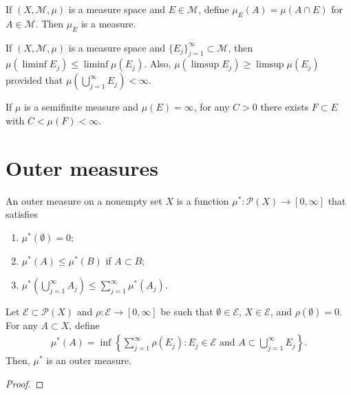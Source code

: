 \begin{proposition}
If $(X, \mathcal{M}, \mu)$ is a measure space and $E \in \mathcal{M}$, define $\mu_E(A) = \mu(A \cap E)$ for $A \in \mathcal{M}$.
Then $\mu_E$ is a measure. 
\end{proposition}

\begin{proposition}
If $(X, \mathcal{M}, \mu)$ is a measure space and $\{ E_j \}_{j=1}^{\infty} \subset \mathcal{M}$, then $\mu(\liminf E_j) \le \liminf \mu(E_j)$.
Also, $\mu(\limsup E_j) \ge \limsup \mu(E_j)$ provided that $\mu(\bigcup_{j=1}^{\infty} E_j) < \infty$.
\end{proposition}

\begin{proposition}
If $\mu$ is a semifinite measure and $\mu(E) = \infty$, for any $C > 0$ there exists $F \subset E$ with $C < \mu(F) < \infty$.
\end{proposition}

\section{Outer measures}

\begin{definition}
An outer measure on a nonempty set $X$ is a function $\mu^*: \mathcal{P}(X) \to [0, \infty]$ that satisfies
\begin{enumerate}
    \item $\mu^*(\emptyset) = 0$;
    \item $\mu^*(A) \le \mu^*(B)$ if $A \subset B$;
    \item $\mu^*(\bigcup_{j=1}^{\infty} A_j) \le \sum_{j=1}^{\infty} \mu^*(A_j)$.
\end{enumerate}
\end{definition}

\begin{proposition}
Let $\mathcal{E} \subset \mathcal{P}(X)$ and $\rho : \mathcal{E} \to [0, \infty]$ be such that $\emptyset \in \mathcal{E}$, $X \in \mathcal{E}$, and $\rho(\emptyset) = 0$.
For any $A \subset X$, define
\begin{align}
\mu^*(A) = \inf \left\{ \sum_{j=1}^{\infty} \rho(E_j): E_j \in \mathcal{E} \text{ and } A \subset \bigcup _{j=1}^{\infty} E_j \right\}.
\end{align}
Then, $\mu^*$ is an outer measure.
\end{proposition}

\begin{proof}

\end{proof}

